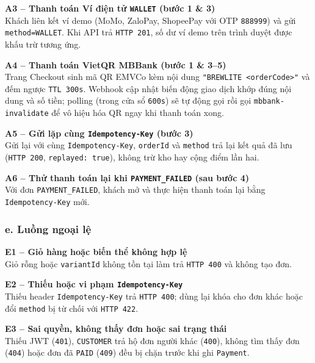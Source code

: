 \documentclass[12pt,a4paper]{report}
\begin{document}
\medskip
\noindent\textbf{A3 -- Thanh toán Ví điện tử \texttt{WALLET} (bước 1 \& 3)} \\
Khách liên kết ví demo (MoMo, ZaloPay, ShopeePay với OTP \texttt{888999}) và gửi \texttt{method=WALLET}. Khi API trả \texttt{HTTP 201}, số dư ví demo trên trình duyệt được khấu trừ tương ứng.

\medskip
\noindent\textbf{A4 -- Thanh toán VietQR MBBank (bước 1 \& 3--5)} \\
Trang Checkout sinh mã QR EMVCo kèm nội dung \texttt{"BREWLITE <orderCode>"} và đếm ngược \texttt{TTL 300s}. Webhook  cập nhật biến động giao dịch khớp đúng nội dung và số tiền; polling  (trong cửa sổ \texttt{600s}) sẽ tự động gọi  rồi gọi \texttt{mbbank-invalidate} để vô hiệu hóa QR ngay khi thanh toán xong.

\medskip
\noindent\textbf{A5 -- Gửi lặp cùng \texttt{Idempotency-Key} (bước 3)} \\
Gửi lại  với cùng \texttt{Idempotency-Key}, \texttt{orderId} và \texttt{method} trả lại kết quả đã lưu (\texttt{HTTP 200}, \texttt{replayed: true}), không trừ kho hay cộng điểm lần hai.

\medskip
\noindent\textbf{A6 -- Thử thanh toán lại khi \texttt{PAYMENT\_FAILED} (sau bước 4)} \\
Với đơn \texttt{PAYMENT\_FAILED}, khách mở  và thực hiện thanh toán lại bằng \texttt{Idempotency-Key} mới.

\subsubsection*{e. Luồng ngoại lệ}

\noindent\textbf{E1 -- Giỏ hàng hoặc biến thể không hợp lệ} \\
Giỏ rỗng hoặc \texttt{variantId} không tồn tại làm  trả \texttt{HTTP 400} và không tạo đơn.

\medskip
\noindent\textbf{E2 -- Thiếu hoặc vi phạm \texttt{Idempotency-Key}} \\
Thiếu header \texttt{Idempotency-Key} trả \texttt{HTTP 400}; dùng lại khóa cho đơn khác hoặc đổi \texttt{method} bị từ chối với \texttt{HTTP 422}.

\medskip
\noindent\textbf{E3 -- Sai quyền, không thấy đơn hoặc sai trạng thái} \\
Thiếu JWT (\texttt{401}), \texttt{CUSTOMER} trả hộ đơn người khác (\texttt{400}), không tìm thấy đơn (\texttt{404}) hoặc đơn đã \texttt{PAID} (\texttt{409}) đều bị chặn trước khi ghi \texttt{Payment}.
\end{document}
